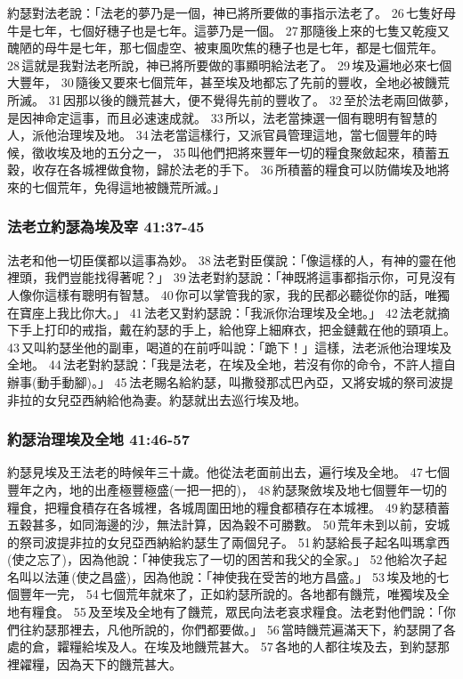 約瑟對法老說：「法老的夢乃是一個，神已將所要做的事指示法老了。 26 七隻好母牛是七年，七個好穗子也是七年。這夢乃是一個。 27 那隨後上來的七隻又乾瘦又醜陋的母牛是七年，那七個虛空、被東風吹焦的穗子也是七年，都是七個荒年。 28 這就是我對法老所說，神已將所要做的事顯明給法老了。 29 埃及遍地必來七個大豐年， 30 隨後又要來七個荒年，甚至埃及地都忘了先前的豐收，全地必被饑荒所滅。 31 因那以後的饑荒甚大，便不覺得先前的豐收了。 32 至於法老兩回做夢，是因神命定這事，而且必速速成就。 33 所以，法老當揀選一個有聰明有智慧的人，派他治理埃及地。 34 法老當這樣行，又派官員管理這地，當七個豐年的時候，徵收埃及地的五分之一， 35 叫他們把將來豐年一切的糧食聚斂起來，積蓄五穀，收存在各城裡做食物，歸於法老的手下。 36 所積蓄的糧食可以防備埃及地將來的七個荒年，免得這地被饑荒所滅。」

\subsubsection{法老立約瑟為埃及宰 41:37-45} 
法老和他一切臣僕都以這事為妙。 38 法老對臣僕說：「像這樣的人，有神的靈在他裡頭，我們豈能找得著呢？」 39 法老對約瑟說：「神既將這事都指示你，可見沒有人像你這樣有聰明有智慧。 40 你可以掌管我的家，我的民都必聽從你的話，唯獨在寶座上我比你大。」 41 法老又對約瑟說：「我派你治理埃及全地。」 42 法老就摘下手上打印的戒指，戴在約瑟的手上，給他穿上細麻衣，把金鏈戴在他的頸項上。 43 又叫約瑟坐他的副車，喝道的在前呼叫說：「跪下！」這樣，法老派他治理埃及全地。 44 法老對約瑟說：「我是法老，在埃及全地，若沒有你的命令，不許人擅自辦事(動手動腳)。」 45 法老賜名給約瑟，叫撒發那忒巴內亞，又將安城的祭司波提非拉的女兒亞西納給他為妻。約瑟就出去巡行埃及地。

\subsubsection{約瑟治理埃及全地 41:46-57} 
約瑟見埃及王法老的時候年三十歲。他從法老面前出去，遍行埃及全地。 47 七個豐年之內，地的出產極豐極盛(一把一把的)， 48 約瑟聚斂埃及地七個豐年一切的糧食，把糧食積存在各城裡，各城周圍田地的糧食都積存在本城裡。 49 約瑟積蓄五穀甚多，如同海邊的沙，無法計算，因為穀不可勝數。 50 荒年未到以前，安城的祭司波提非拉的女兒亞西納給約瑟生了兩個兒子。 51 約瑟給長子起名叫瑪拿西(使之忘了)，因為他說：「神使我忘了一切的困苦和我父的全家。」 52 他給次子起名叫以法蓮 (使之昌盛)，因為他說：「神使我在受苦的地方昌盛。」 53 埃及地的七個豐年一完， 54 七個荒年就來了，正如約瑟所說的。各地都有饑荒，唯獨埃及全地有糧食。 55 及至埃及全地有了饑荒，眾民向法老哀求糧食。法老對他們說：「你們往約瑟那裡去，凡他所說的，你們都要做。」 56 當時饑荒遍滿天下，約瑟開了各處的倉，糶糧給埃及人。在埃及地饑荒甚大。 57 各地的人都往埃及去，到約瑟那裡糴糧，因為天下的饑荒甚大。

